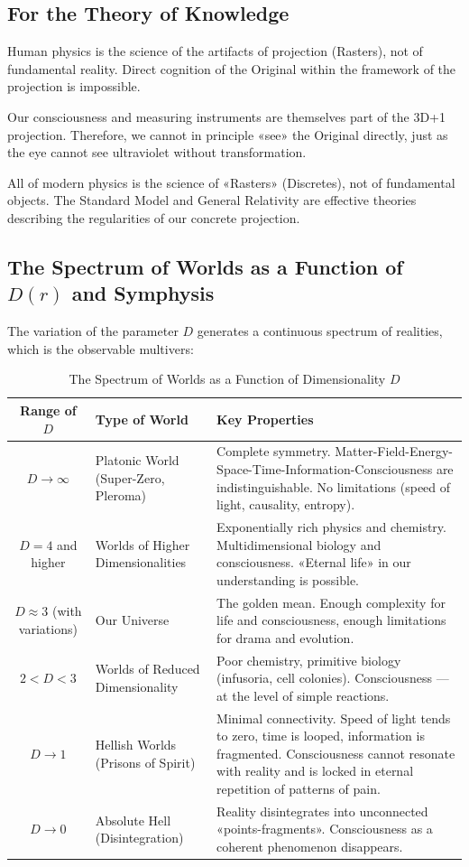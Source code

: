 \documentclass[a4paper,12pt]{article}
\begin{document}
	\subsection{For the Theory of Knowledge}
	
	Human physics is the science of the artifacts of projection (Rasters), not of fundamental reality. Direct cognition of the Original within the framework of the projection is impossible.
	
	Our consciousness and measuring instruments are themselves part of the 3D+1 projection. Therefore, we cannot in principle «see» the Original directly, just as the eye cannot see ultraviolet without transformation.
	
	All of modern physics is the science of «Rasters» (Discretes), not of fundamental objects. The Standard Model and General Relativity are effective theories describing the regularities of our concrete projection.
	
	\subsection{The Spectrum of Worlds as a Function of $D(r)$ and Symphysis}
	
	The variation of the parameter $D$ generates a continuous spectrum of realities, which is the observable multivers:
	
	\begin{table}[H]
		\centering
		\begin{tabular}{|c|p{3.5cm}|p{8.5cm}|}
			\hline
			\textbf{Range of $D$} & \textbf{Type of World} & \textbf{Key Properties} \\
			\hline
			$D \to \infty$ & Platonic World (Super-Zero, Pleroma) & Complete symmetry. Matter-Field-Energy-Space-Time-Information-Consciousness are indistinguishable. No limitations (speed of light, causality, entropy). \\
			\hline
			$D = 4$ and higher & Worlds of Higher Dimensionalities & Exponentially rich physics and chemistry. Multidimensional biology and consciousness. «Eternal life» in our understanding is possible. \\
			\hline
			$D \approx 3$ (with variations) & Our Universe & The golden mean. Enough complexity for life and consciousness, enough limitations for drama and evolution. \\
			\hline
			$2 < D < 3$ & Worlds of Reduced Dimensionality & Poor chemistry, primitive biology (infusoria, cell colonies). Consciousness — at the level of simple reactions. \\
			\hline
			$D \to 1$ & Hellish Worlds (Prisons of Spirit) & Minimal connectivity. Speed of light tends to zero, time is looped, information is fragmented. Consciousness cannot resonate with reality and is locked in eternal repetition of patterns of pain. \\
			\hline
			$D \to 0$ & Absolute Hell (Disintegration) & Reality disintegrates into unconnected «points-fragments». Consciousness as a coherent phenomenon disappears. \\
			\hline
		\end{tabular}
		\caption{The Spectrum of Worlds as a Function of Dimensionality $D$}
	\end{table}
	
\end{document}
